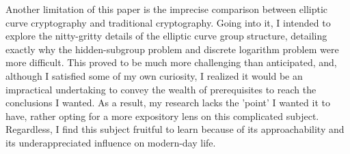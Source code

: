 \documentclass[11pt, a4paper]{report}
\begin{document}
Another limitation of this paper is the imprecise comparison between elliptic curve cryptography and traditional cryptography. Going into it, I intended to explore the nitty-gritty details of the elliptic curve group structure, detailing exactly why the hidden-subgroup problem and discrete logarithm problem were more difficult. This proved to be much more challenging than anticipated, and, although I satisfied some of my own curiosity, I realized it would be an impractical undertaking to convey the wealth of prerequisites to reach the conclusions I wanted. As a result, my research lacks the 'point' I wanted it to have, rather opting for a more expository lens on this complicated subject. Regardless, I find this subject fruitful to learn because of its approachability and its underappreciated influence on modern-day life.


\newpage 

\printbibliography
\end{document}
